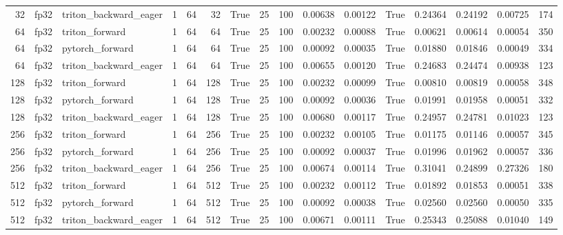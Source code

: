 \begin{tabular}{rllrrrrrrrrrrrrr}
32 & fp32 & triton\_backward\_eager & 1 & 64 & 32 & True & 25 & 100 & 0.00638 & 0.00122 & True & 0.24364 & 0.24192 & 0.00725 & 174 \\
64 & fp32 & triton\_forward & 1 & 64 & 64 & True & 25 & 100 & 0.00232 & 0.00088 & True & 0.00621 & 0.00614 & 0.00054 & 350 \\
64 & fp32 & pytorch\_forward & 1 & 64 & 64 & True & 25 & 100 & 0.00092 & 0.00035 & True & 0.01880 & 0.01846 & 0.00049 & 334 \\
64 & fp32 & triton\_backward\_eager & 1 & 64 & 64 & True & 25 & 100 & 0.00655 & 0.00120 & True & 0.24683 & 0.24474 & 0.00938 & 123 \\
128 & fp32 & triton\_forward & 1 & 64 & 128 & True & 25 & 100 & 0.00232 & 0.00099 & True & 0.00810 & 0.00819 & 0.00058 & 348 \\
128 & fp32 & pytorch\_forward & 1 & 64 & 128 & True & 25 & 100 & 0.00092 & 0.00036 & True & 0.01991 & 0.01958 & 0.00051 & 332 \\
128 & fp32 & triton\_backward\_eager & 1 & 64 & 128 & True & 25 & 100 & 0.00680 & 0.00117 & True & 0.24957 & 0.24781 & 0.01023 & 123 \\
256 & fp32 & triton\_forward & 1 & 64 & 256 & True & 25 & 100 & 0.00232 & 0.00105 & True & 0.01175 & 0.01146 & 0.00057 & 345 \\
256 & fp32 & pytorch\_forward & 1 & 64 & 256 & True & 25 & 100 & 0.00092 & 0.00037 & True & 0.01996 & 0.01962 & 0.00057 & 336 \\
256 & fp32 & triton\_backward\_eager & 1 & 64 & 256 & True & 25 & 100 & 0.00674 & 0.00114 & True & 0.31041 & 0.24899 & 0.27326 & 180 \\
512 & fp32 & triton\_forward & 1 & 64 & 512 & True & 25 & 100 & 0.00232 & 0.00112 & True & 0.01892 & 0.01853 & 0.00051 & 338 \\
512 & fp32 & pytorch\_forward & 1 & 64 & 512 & True & 25 & 100 & 0.00092 & 0.00038 & True & 0.02560 & 0.02560 & 0.00050 & 335 \\
512 & fp32 & triton\_backward\_eager & 1 & 64 & 512 & True & 25 & 100 & 0.00671 & 0.00111 & True & 0.25343 & 0.25088 & 0.01040 & 149 \\
\bottomrule
\end{tabular}
